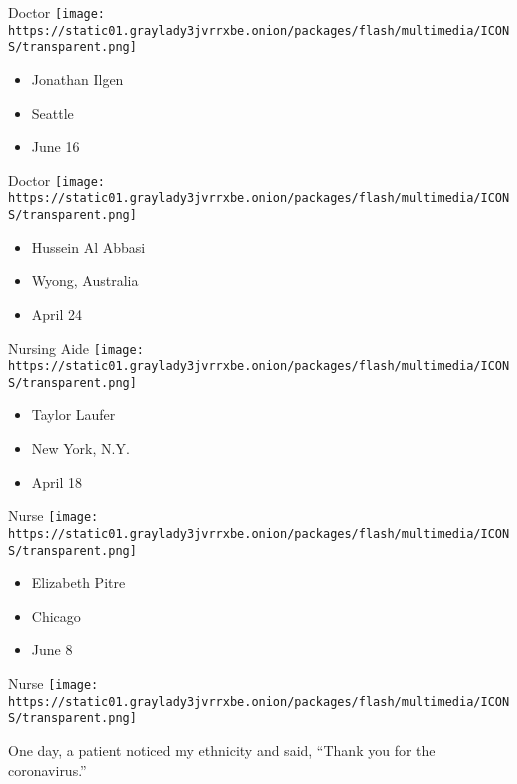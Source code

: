 \protect\hyperlink{item-jonathan-ilgen}{}

Doctor
\texttt{[image: https://static01.graylady3jvrrxbe.onion/packages/flash/multimedia/ICONS/transparent.png]}

\begin{itemize}
\tightlist
\item
  Jonathan Ilgen
\item
  Seattle
\item
  June 16
\end{itemize}

\protect\hyperlink{item-hussein-al-abbasi}{}

Doctor
\texttt{[image: https://static01.graylady3jvrrxbe.onion/packages/flash/multimedia/ICONS/transparent.png]}

\begin{itemize}
\tightlist
\item
  Hussein Al Abbasi
\item
  Wyong, Australia
\item
  April 24
\end{itemize}

\protect\hyperlink{item-taylor-laufer}{}

Nursing Aide
\texttt{[image: https://static01.graylady3jvrrxbe.onion/packages/flash/multimedia/ICONS/transparent.png]}

\begin{itemize}
\tightlist
\item
  Taylor Laufer
\item
  New York, N.Y.
\item
  April 18
\end{itemize}

\protect\hyperlink{item-elizabeth-pitre}{}

Nurse
\texttt{[image: https://static01.graylady3jvrrxbe.onion/packages/flash/multimedia/ICONS/transparent.png]}

\begin{itemize}
\tightlist
\item
  Elizabeth Pitre
\item
  Chicago
\item
  June 8
\end{itemize}

\protect\hyperlink{item-sewon-lee}{}

Nurse
\texttt{[image: https://static01.graylady3jvrrxbe.onion/packages/flash/multimedia/ICONS/transparent.png]}

One day, a patient noticed my ethnicity and said, ``Thank you for the
coronavirus.''

